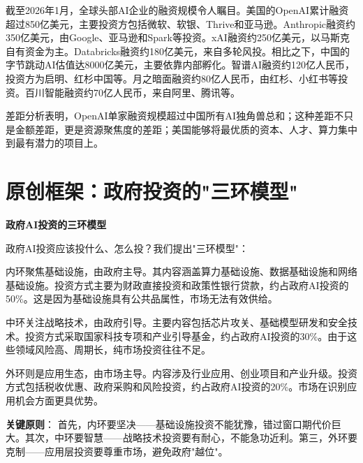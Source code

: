 截至2026年1月，全球头部AI企业的融资规模令人瞩目。美国的OpenAI累计融资超过850亿美元，主要投资方包括微软、软银、Thrive和亚马逊。Anthropic融资约350亿美元，由Google、亚马逊和Spark等投资。xAI融资约250亿美元，以马斯克自有资金为主。Databricks融资约180亿美元，来自多轮风投。相比之下，中国的字节跳动AI估值达8000亿美元，主要依靠内部孵化。智谱AI融资约120亿人民币，投资方为启明、红杉中国等。月之暗面融资约80亿人民币，由红杉、小红书等投资。百川智能融资约70亿人民币，来自阿里、腾讯等。

差距分析表明，OpenAI单家融资规模超过中国所有AI独角兽总和；这种差距不只是金额差距，更是资源聚焦度的差距；美国能够将最优质的资本、人才、算力集中到最有潜力的项目上。

\section{原创框架：政府投资的"三环模型"}

\textbf{政府AI投资的三环模型}

政府AI投资应该投什么、怎么投？我们提出"三环模型"：

内环聚焦基础设施，由政府主导。其内容涵盖算力基础设施、数据基础设施和网络基础设施。投资方式主要为财政直接投资和政策性银行贷款，约占政府AI投资的50\%。这是因为基础设施具有公共品属性，市场无法有效供给。

中环关注战略技术，由政府引导。主要内容包括芯片攻关、基础模型研发和安全技术。投资方式采取国家科技专项和产业引导基金，约占政府AI投资的30\%。由于这些领域风险高、周期长，纯市场投资往往不足。

外环则是应用生态，由市场主导。内容涉及行业应用、创业项目和产业升级。投资方式包括税收优惠、政府采购和风险投资，约占政府AI投资的20\%。市场在识别应用机会方面更具优势。

\begin{center}
\end{center}

\textbf{关键原则}：
首先，内环要坚决——基础设施投资不能犹豫，错过窗口期代价巨大。其次，中环要智慧——战略技术投资要有耐心，不能急功近利。第三，外环要克制——应用层投资要尊重市场，避免政府"越位"。

